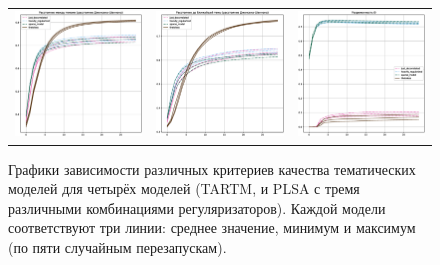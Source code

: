 \begin{figure}
\begin{tabular}{ccc}
    \includegraphics[width=54mm]{images/CH4_vs_regularized_diversity_jensenshannon_False.eps} &   \includegraphics[width=54mm]{images/CH4_vs_regularized_diversity_jensenshannon_True.eps} & \includegraphics[width=54mm]{images/CH4_vs_regularized_SparsityThetaScore.eps} \\

\end{tabular}
    \caption{Графики зависимости различных критериев качества тематических моделей для четырёх моделей (TARTM, и PLSA с тремя различными комбинациями регуляризаторов). Каждой модели соответствуют три линии: среднее значение, минимум и максимум (по пяти случайным перезапускам).}
\label{fig:ch4_vs_reg}

\end{figure}

